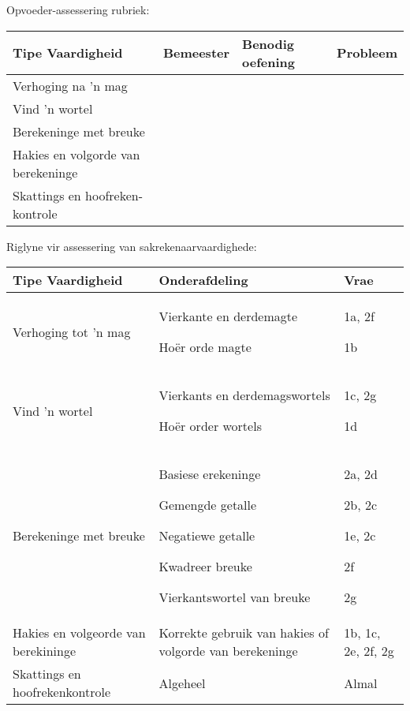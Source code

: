 Opvoeder-assessering rubriek:
\begin{table}[H]
 \begin{center}
  \begin{tabular}{|p{4.5cm}|p{1.5cm}|p{3cm}|p{1.5cm}|} \hline

\textbf{Tipe Vaardigheid} & \textbf{Bemeester} & \textbf{Benodig oefening} & \textbf{Probleem}   \\ \hline
Verhoging na 'n mag &&&\\ \hline
Vind 'n wortel &&&\\ \hline
Berekeninge met breuke &&&\\ \hline
Hakies en volgorde van berekeninge &&&\\ \hline
Skattings en hoofreken-kontrole &&&\\ \hline
   
  \end{tabular}

 \end{center}

\end{table}
Riglyne vir assessering van sakrekenaarvaardighede:
\begin{table}[H]
 \begin{center}
  \begin{tabular}{|p{5cm}|p{4cm}|p{3cm}|} \hline

\textbf{Tipe Vaardigheid} & \textbf{Onderafdeling} & \textbf{Vrae}   \\ \hline
Verhoging tot 'n mag  & Vierkante en derdemagte\par Ho\"{e}r orde magte&1a, 2f \par1b \\ \hline
Vind 'n wortel& Vierkants en derdemagswortels \par Ho\"{e}r order wortels & 1c, 2g \par 1d\\ \hline
Berekeninge met breuke & Basiese erekeninge \par Gemengde getalle \par Negatiewe getalle \par Kwadreer breuke \par Vierkantswortel van breuke &2a,  2d\par
2b, 2c\par
1e, 2c\par
2f\par
2g
\\ \hline
Hakies en volgeorde van berekininge&Korrekte gebruik van hakies of volgorde van berekeninge&1b, 1c, 2e, 2f, 2g\\ \hline
Skattings en hoofrekenkontrole &Algeheel&Almal\\ \hline
   
  \end{tabular}

 \end{center}

\end{table}

